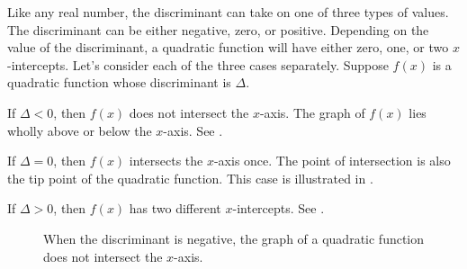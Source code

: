 \documentclass[a4paper,oneside,12pt]{article}
\begin{document}
Like any real number, the discriminant can take on one of three types
of values.  The discriminant can be either negative, zero, or
positive.  Depending on the value of the discriminant, a quadratic
function will have either zero, one, or two $x$-intercepts.  Let's
consider each of the three cases separately.  Suppose $f(x)$ is a
quadratic function whose discriminant is $\Delta$.

\begin{packedenumeral}
\item If $\Delta < 0$, then $f(x)$ does not intersect the $x$-axis.
  The graph of $f(x)$ lies wholly above or below the $x$-axis.  See
  .

\item If $\Delta = 0$, then $f(x)$ intersects the $x$-axis once.  The
  point of intersection is also the tip point of the quadratic
  function.  This case is illustrated in
  .

\item If $\Delta > 0$, then $f(x)$ has two different $x$-intercepts.
  See .
\end{packedenumeral}

\begin{figure}[!htbp]
\centering
{}
\quad
\caption{%
  When the discriminant is negative, the graph of a quadratic function
  does not intersect the $x$-axis.
}
\label{fig:negative_discriminant}
\end{figure}
\end{document}
